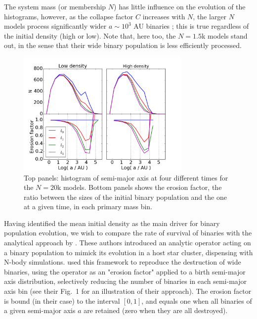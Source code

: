 The system mass (or membership $N$) has little influence on the evolution of the histograms, however, as the collapse factor $C$ increases with $N$, the larger $N$ models process significantly wider $a \sim 10^3$ AU binaries ; this is true regardless of the initial density (high or low). Note that, here too, the $N = 1.5$k models stand out, in the sense that their wide binary population is less efficiently processed.
%

\begin{figure}
\begin{center}
\includegraphics[width=0.75\textwidth]{Figures/6_S_shape}
\caption{Top panels: histogram of semi-major axis at four different times for the $N = 20$k  models. 
Bottom panels shows the erosion factor, the ratio between the sizes of the initial binary population and the one at a given time, in each primary mass bin. }
\label{Fig:6_S_shape}
\end{center}
\end{figure}

Having identified the mean initial density as the main driver for binary population evolution, we wish to compare the rate of survival of binaries with the analytical approach by  \cite{Marks2011}. These authors  introduced an analytic operator acting on a binary population to mimick its evolution in  a host star cluster,  dispensing with N-body simulations.  \cite{Marks2012} used this framework to reproduce the destruction of wide binaries, using the operator as an "erosion  factor" applied to a birth semi-major axis distribution, selectively reducing the number of binaries in each semi-major axis bin (see their Fig.~1 for an illustration of their approach). The erosion factor is bound (in their case) to the interval $[0, 1]$, and equals one when all binaries of a given semi-major axis $a$ are retained (zero when they are all destroyed). 


